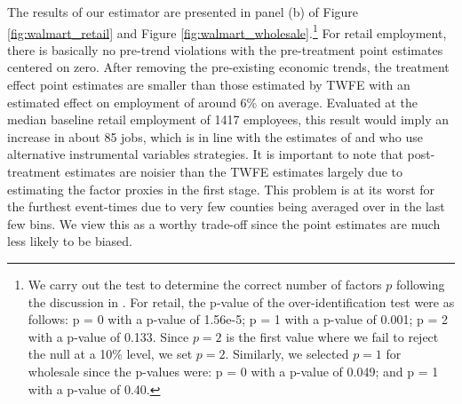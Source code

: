 \documentclass[12pt]{article}
\begin{document}
\begin{figure}
\end{figure}

The results of our estimator are presented in panel (b) of Figure \ref{fig:walmart_retail} and Figure \ref{fig:walmart_wholesale}.\footnote{We carry out the test to determine the correct number of factors $p$ following the discussion in \citet{Ahn_Lee_Schmidt_2013}. For retail, the p-value of the over-identification test were as follows: p = 0 with a p-value of 1.56e-5; p = 1 with a p-value of 0.001; p = 2 with a p-value of 0.133.  Since $p = 2$ is the first value where we fail to reject the null at a 10\% level, we set $p = 2$. Similarly, we selected $p = 1$ for wholesale since the p-values were: p = 0 with a p-value of 0.049; and p = 1 with a p-value of 0.40.} For retail employment, there is basically no pre-trend violations with the pre-treatment point estimates centered on zero. After removing the pre-existing economic trends, the treatment effect point estimates are smaller than those estimated by TWFE with an estimated effect on employment of around 6\% on average. Evaluated at the median baseline retail employment of 1417 employees, this result would imply an increase in about 85 jobs, which is in line with the estimates of \citet{basker2005job} and \citet{stapp2014Walmart} who use alternative instrumental variables strategies. It is important to note that post-treatment estimates are noisier than the TWFE estimates largely due to estimating the factor proxies in the first stage. This problem is at its worst for the furthest event-times due to very few counties being averaged over in the last few bins. We view this as a worthy trade-off since the point estimates are much less likely to be biased. 
\end{document}
